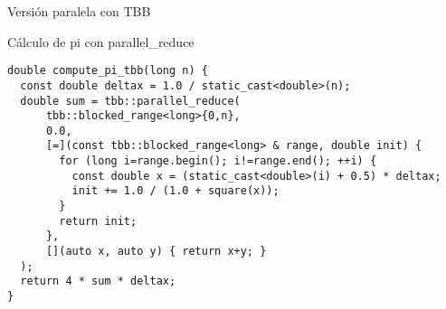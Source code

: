 \begin{frame}[t,fragile]{Versión paralela con TBB}
\begin{block}{Cálculo de pi con parallel\_reduce}
\begin{lstlisting}
double compute_pi_tbb(long n) {
  const double deltax = 1.0 / static_cast<double>(n);
  double sum = tbb::parallel_reduce(
      tbb::blocked_range<long>{0,n},
      0.0,
      [=](const tbb::blocked_range<long> & range, double init) {
        for (long i=range.begin(); i!=range.end(); ++i) {
          const double x = (static_cast<double>(i) + 0.5) * deltax;
          init += 1.0 / (1.0 + square(x));
        }
        return init;
      },
      [](auto x, auto y) { return x+y; }
  );
  return 4 * sum * deltax;
}
\end{lstlisting}
\end{block}
\end{frame}
